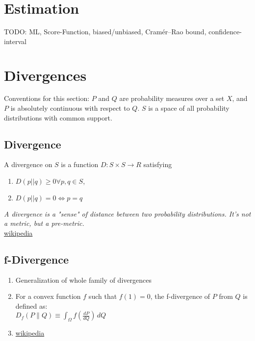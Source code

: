 \section{Estimation}
TODO: ML, Score-Function, biased/unbiased, Cramér–Rao bound, confidence-interval

\section{Divergences}
Conventions for this section: $P$ and $Q$ are probability measures over a set $X$, and $P$ is absolutely continuous with respect to $Q$. $S$ is a space of all probability distributions with common support.
\subsection{Divergence}
A divergence on $S$ is a function $D: S \times S \rightarrow R$ satisfying
\begin{enumerate}
	\item $D(p || q) \geq 0  \forall p, q \in S$,
	\item $D(p || q) = 0 \Leftrightarrow p = q$
\end{enumerate}
\textit{A divergence is a "sense" of distance between two probability distributions. It's not a metric, but a pre-metric.}\\
\href{https://en.wikipedia.org/wiki/Divergence_(statistics)}{wikipedia}

\subsection{f-Divergence}
\begin{enumerate}
	\item Generalization of whole family of divergences
	\item For a convex function $f$ such that $f(1) = 0$, the f-divergence of $P$ from $Q$ is defined as:\\
	$D_{f}(P\parallel Q)\equiv \int _{{\Omega }}f\left({\frac{dP}{dQ}}\right)\,dQ$
	\item \href{https://en.wikipedia.org/wiki/Divergence_(statistics)}{wikipedia}
\end{enumerate}

